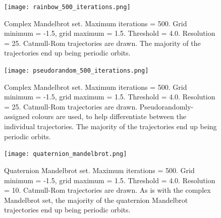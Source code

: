 \documentclass[12pt]{article}
\begin{document}
\begin{figure} 
\centering
  \texttt{[image: rainbow\_500\_iterations.png]}	
  \caption{
Complex Mandelbrot set.
Maximum iterations = 500.
Grid minimum = -1.5, grid maximum = 1.5.
Threshold = 4.0. 
Resolution = 25.
Catmull-Rom trajectories are drawn.
The majority of the trajectories end up being periodic orbits.}
\end{figure}

\begin{figure} 
\centering
  \texttt{[image: pseudorandom\_500\_iterations.png]}	
  \caption{
Complex Mandelbrot set.
Maximum iterations = 500.
Grid minimum = -1.5, grid maximum = 1.5.
Threshold = 4.0.
Resolution = 25.
Catmull-Rom trajectories are drawn.
Pseudorandomly-assigned colours are used, to help differentiate between the individual trajectories.
The majority of the trajectories end up being periodic orbits.}
\end{figure}










\begin{figure} 
\centering
  \texttt{[image: quaternion\_mandelbrot.png]}	
  \caption{
Quaternion Mandelbrot set.
Maximum iterations = 500.
Grid minimum = -1.5, grid maximum = 1.5.
Threshold = 4.0.
Resolution = 10.
Catmull-Rom trajectories are drawn.
As is with the complex Mandelbrot set, the majority of the quaternion Mandelbrot trajectories end up being periodic orbits.}
\end{figure}
\end{document}
